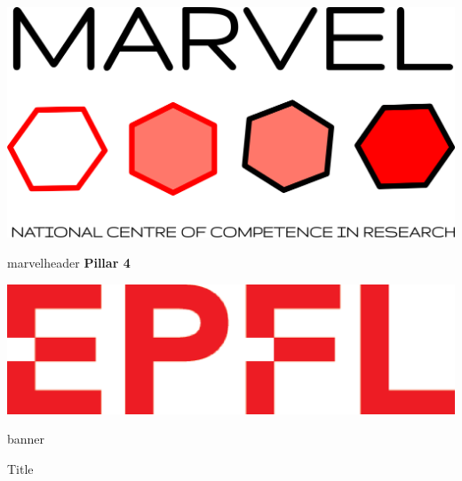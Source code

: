 \documentclass{beamer}
\begin{document}
\newcommand{\citeauthoryear}[1]{\citeauthor{#1} \citeyear{#1}}
\begin{frame}[t]{}

    \vspace{-0.001\paperheight}
    \begin{beamercolorbox}[wd=\textwidth,sep=1em]{}
        \begin{minipage}[height=0.15\textwidth]{0.15\textwidth}
            \includegraphics[width=\textwidth]{figures/marvel_trimmed.png}
        \end{minipage}
        \hfill
        \begin{minipage}[height=0.15\textwidth]{0.4\textwidth}
            \begin{beamercolorbox}[wd=\textwidth,sep=1em]{marvelheader}
                \centering
                \bf
                {\fontsize{100}{120}\selectfont Pillar 4}
            \end{beamercolorbox}
        \end{minipage}
        \hfill
        \begin{minipage}[height=0.15\textwidth]{0.15\textwidth}
            \includegraphics[width=\textwidth]{figures/red_cropped.eps}
        \end{minipage}
    \end{beamercolorbox}
    \begin{beamercolorbox}[wd=\textwidth,sep=1em]{banner}
        \bf
        \begin{center}
            {\fontsize{150}{180}\selectfont Title}


\end{center}
\end{beamercolorbox}
\end{frame}
\end{document}
